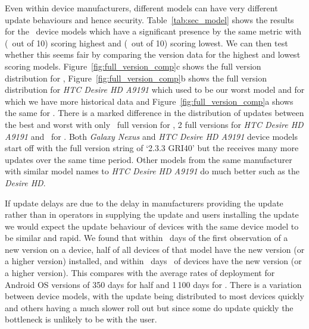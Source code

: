 \daTabSecScoresmodel
Even within device manufacturers, different models can have very different update behaviours and hence security.
Table~\ref{tab:sec_model} shows the results for the \daNumSigModels\ device models which have a significant presence by the same metric with \emph{\daSecScoreBestmodel} (\daSecScoreBestmodelScore\ out of 10) scoring highest and \emph{\daSecScoreWorstmodel} (\daSecScoreWorstmodelScore\ out of 10) scoring lowest.
We can then test whether this seems fair by comparing the version data for the highest and lowest scoring models.
Figure~\ref{fig:full_version_comp}c shows the full version distribution for \emph{\daSecScoreWorstmodel}, Figure~\ref{fig:full_version_comp}b shows the full version distribution for \emph{HTC Desire HD A9191} which used to be our worst model and for which we have more historical data and Figure~\ref{fig:full_version_comp}a shows the same for \emph{\daSecScoreBestmodel}.
There is a marked difference in the distribution of updates between the best and worst with only \daSecScoreWorstmodelNumFullVersions\ full version for \emph{\daSecScoreWorstmodel}, 2 full versions for \emph{HTC Desire HD A9191} and \daSecScoreBestmodelNumFullVersions\ for \emph{\daSecScoreBestmodel}.
Both \emph{Galaxy Nexus} and \emph{HTC Desire HD A9191} device models start off with the full version string of `2.3.3 GRI40' but the \emph{\daSecScoreBestmodel} receives many more updates over the same time period.
Other models from the same manufacturer with similar model names to \emph{HTC Desire HD A9191} do much better such as the \emph{Desire HD}.

If update delays are due to the delay in manufacturers providing the update rather than in operators in supplying the update and users installing the update we would expect the update behaviour of devices with the same device model to be similar and rapid.
We found that within \daModelHalfDeployment\ days of the first observation of a new version on a device, half of all devices of that model have the new version (or a higher version) installed, and within \daModelFullDeployment\ days \daFullDeployedAt\ of devices have the new version (or a higher version).
This compares with the average rates of deployment for Android OS versions of 350 days for half and 1\,100 days for \daFullDeployedAt.
There is a variation between device models, with the update being distributed to most devices quickly and others having a much slower roll out but since some do update quickly the bottleneck is unlikely to be with the user.

